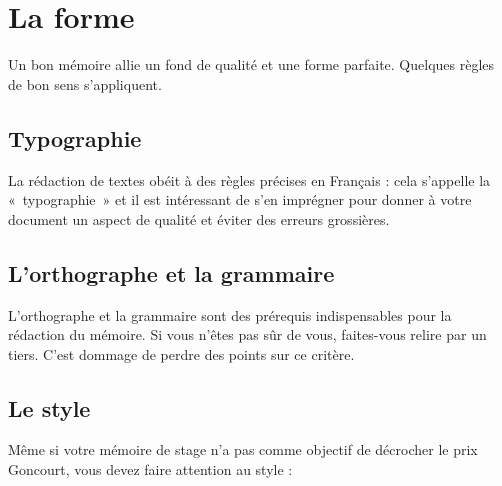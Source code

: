 \documentclass [twoside,openright,a4paper,11pt,french] {report}
\begin{document}
\chapter {La forme}
    \label {chap:contexte}

Un bon mémoire allie un fond de qualité et une forme parfaite. Quelques
règles de bon sens s'appliquent.

\section {Typographie}

La rédaction de textes obéit à des règles précises en
Français : cela s'appelle la «~typographie~» \cite{andre1990} et il
est intéressant de s'en imprégner pour donner à votre document un
aspect de qualité et éviter des erreurs grossières.

\section {L'orthographe et la grammaire}

L'orthographe et la grammaire sont des prérequis indispensables pour
la rédaction du mémoire. Si vous n'êtes pas sûr de vous, faites-vous
relire par un tiers. C'est dommage de perdre des points sur ce critère.

\section {Le style}

Même si votre mémoire de stage n'a pas comme objectif de décrocher
le prix Goncourt, vous devez faire attention au style :
\end{document}

